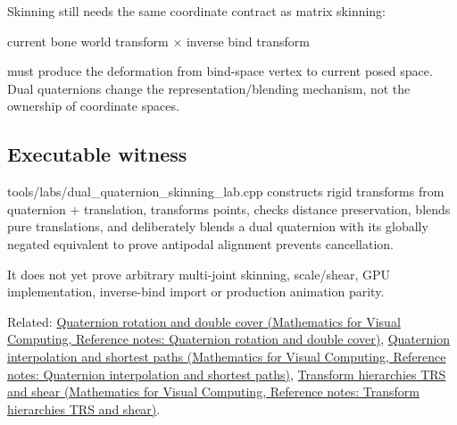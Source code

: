Skinning still needs the same coordinate contract as matrix skinning:

current bone world transform × inverse bind transform

must produce the deformation from bind-space vertex to current posed space. Dual quaternions change the representation/blending mechanism, not the ownership of coordinate spaces.

\subsection{Executable witness}\label{appendix-921f3f2efb53-executable-witness}

tools/labs/dual\_quaternion\_skinning\_lab.cpp constructs rigid transforms from quaternion + translation, transforms points, checks distance preservation, blends pure translations, and deliberately blends a dual quaternion with its globally negated equivalent to prove antipodal alignment prevents cancellation.

It does not yet prove arbitrary multi-joint skinning, scale/shear, GPU implementation, inverse-bind import or production animation parity.

Related: \href{../02-Mathematics-for-Visual-Computing/main.pdf\#nameddest=appendix-8e61ab68f6b2}{Quaternion rotation and double cover (Mathematics for Visual Computing, Reference notes: Quaternion rotation and double cover)}, \href{../02-Mathematics-for-Visual-Computing/main.pdf\#nameddest=appendix-9b4b8254f26b}{Quaternion interpolation and shortest paths (Mathematics for Visual Computing, Reference notes: Quaternion interpolation and shortest paths)}, \href{../02-Mathematics-for-Visual-Computing/main.pdf\#nameddest=appendix-292c061cd47c}{Transform hierarchies TRS and shear (Mathematics for Visual Computing, Reference notes: Transform hierarchies TRS and shear)}.
